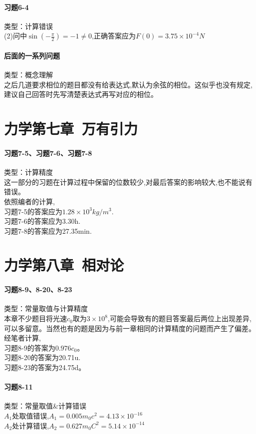\documentclass[a4paper,11pt]{ctexart}
\begin{document}
\paragraph{习题6-4}类型：计算错误\\
(2)问中$\sin{(-\frac{\pi}{2})} = -1 \neq 0$,正确答案应为$F(0)=3.75 \times 10^{-4}N$

\paragraph{后面的一系列问题}类型：概念理解\\
之后几道要求相位的题目都没有给表达式,默认为余弦的相位。这似乎也没有规定,建议自己回答时先写清楚表达式再写对应的相位。

\section{力学第七章\ 万有引力}
\paragraph{习题7-5、习题7-6、习题7-8}类型：计算精度\\
这一部分的习题在计算过程中保留的位数较少,对最后答案的影响较大,也不能说有错误。\\
依照编者的计算,\\习题7-5的答案应为$1.28 \times 10^{3} kg/m^{3}$.
\\习题7-6的答案应为3.30h.
\\习题7-8的答案应为27.35min.

\section{力学第八章\ 相对论}
\paragraph{习题8-9、8-20、8-23}类型：常量取值与计算精度\\
本章不少题目将光速$c_0$取为$3 \times 10^8$,可能会导致有的题目答案最后两位上出现差异,可以多留意。当然也有的题是因为与前一章相同的计算精度的问题而产生了偏差。\\
经笔者计算,\\
习题8-9的答案为$0.976c_0$。\\
习题8-20的答案为20.71u.\\
习题8-23的答案为24.75d。\\

\paragraph{习题8-11}类型：常量取值\&计算错误\\
$A_1$处取值错误,$A_1=0.005m_0c^2=4.13\times10^{-16}$\\
$A_2$处计算错误,$A_2=0.627m_0C^2=5.14\times10^{-14}$
\end{document}
